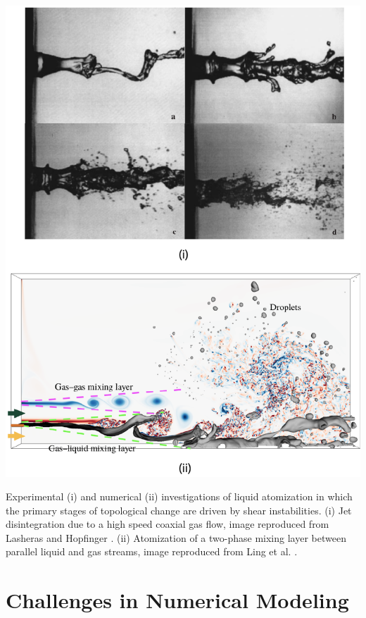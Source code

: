\begin{marginfigure}
\centering
\includegraphics{plots/intro/shear.pdf}
	\caption{ Experimental (i) and numerical (ii) investigations of liquid atomization 
	in which the primary stages of topological change are driven by shear instabilities. 
	(i) Jet disintegration due to a high speed coaxial gas flow, image reproduced from Lasheras and Hopfinger \cite{lasheras}.
	(ii) Atomization of a two-phase mixing layer between parallel liquid and gas streams, image 
	reproduced from Ling et al. \cite{ling}.
	}
\label{shear}
\end{marginfigure}

\section*{Challenges in Numerical Modeling}


